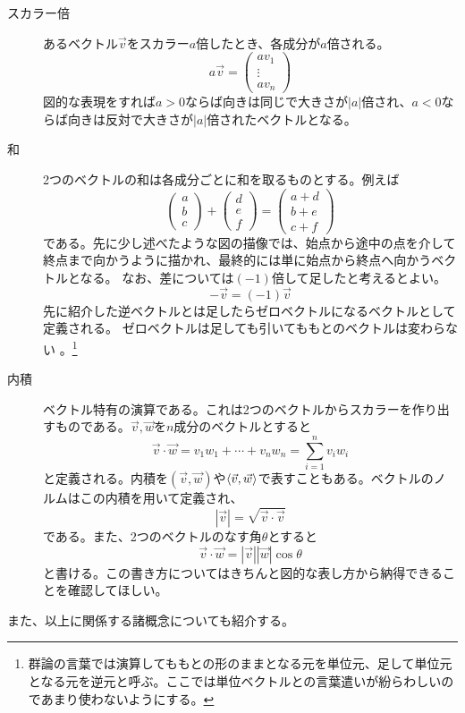 \documentclass[10pt]{jsarticle}
\numberwithin{equation}{section}%
\begin{document}
\begin{description}
  \item[スカラー倍] あるベクトル$\vec{v}$をスカラー$a$倍したとき、各成分が$a$倍される。
  \begin{equation}
    a\vec{v}=\left( \begin{matrix}
      av_{1}\\
      \vdots \\
      av_{n}
    \end{matrix} \right)
  \end{equation}
  図的な表現をすれば$a>0$ならば向きは同じで大きさが$|a|$倍され、$a<0$ならば向きは反対で大きさが$|a|$倍されたベクトルとなる。
  \item[和] 2つのベクトルの和は各成分ごとに和を取るものとする。例えば
  \begin{equation}
    \left( \begin{matrix}
      a\\
      b\\
      c
    \end{matrix} \right)+\left( \begin{matrix}
      d\\
      e\\
      f
    \end{matrix} \right)=\left( \begin{matrix}
      a+d\\
      b+e\\
      c+f
    \end{matrix} \right)
  \end{equation}
  である。先に少し述べたような図の描像では、始点から途中の点を介して終点まで向かうように描かれ、最終的には単に始点から終点へ向かうベクトルとなる。
  なお、差については$(-1)$倍して足したと考えるとよい。
  \begin{equation}
    -\vec{v}=(-1)\vec{v}
  \end{equation}
  先に紹介した逆ベクトルとは足したらゼロベクトルになるベクトルとして定義される。
  ゼロベクトルは足しても引いてももとのベクトルは変わらない
  。\footnote{群論の言葉では演算してももとの形のままとなる元を単位元、足して単位元となる元を逆元と呼ぶ。ここでは単位ベクトルとの言葉遣いが紛らわしいのであまり使わないようにする。}
  \item[内積] ベクトル特有の演算である。これは2つのベクトルからスカラーを作り出すものである。$\vec{v},\vec{w}$を$n$成分のベクトルとすると
  \begin{equation}
    \vec{v}\cdot \vec{w} = v_{1}w_{1}+\cdots + v_{n}w_{n}=\sum_{i=1}^{n}v_{i}w_{i}
  \end{equation}
と定義される。内積を$(\vec{v},\vec{w})$や$\braket{\vec{v},\vec{w}}$で表すこともある。ベクトルのノルムはこの内積を用いて定義され、
\begin{equation}
  |\vec{v}|=\sqrt{\vec{v}\cdot \vec{v}}
\end{equation}
である。また、2つのベクトルのなす角$\theta$とすると
\begin{equation}
  \vec{v}\cdot \vec{w}=|\vec{v}||\vec{w}|\cos{\theta}
\end{equation}
と書ける。この書き方についてはきちんと図的な表し方から納得できることを確認してほしい。
\end{description}
また、以上に関係する諸概念についても紹介する。
\end{document}
